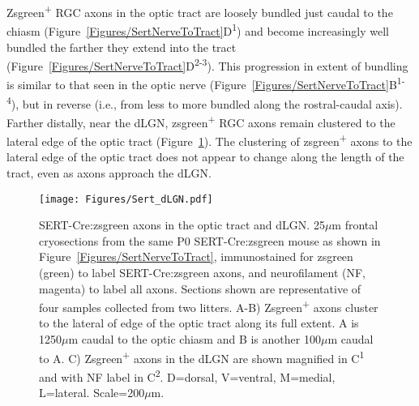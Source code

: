 Zsgreen\textsuperscript{+} RGC axons in the optic tract are loosely bundled just caudal to the chiasm (Figure~\ref{Figures/SertNerveToTract}D\textsuperscript{1}) and become increasingly well bundled the farther they extend into the tract (Figure~\ref{Figures/SertNerveToTract}D\textsuperscript{2-3}).
This progression in extent of bundling is similar to that seen in the optic nerve (Figure~\ref{Figures/SertNerveToTract}B\textsuperscript{1-4}), but in reverse (i.e., from less to more bundled along the rostral-caudal axis).
Farther distally, near the dLGN, zsgreen\textsuperscript{+} RGC axons remain clustered to the lateral edge of the optic tract (Figure~\ref{Figures/SertdLGN}).
The clustering of zsgreen\textsuperscript{+} axons to the lateral edge of the optic tract does not appear to change along the length of the tract, even as axons approach the dLGN.

\begin{figure}[hbtp]
    \begin{center}
        \texttt{[image: Figures/Sert\_dLGN.pdf]}
        \caption[SERT-Cre:zsgreen axons in the optic tract and dLGN.]
        {SERT-Cre:zsgreen axons in the optic tract and dLGN.
        25$\mu$m frontal cryosections from the same P0 SERT-Cre:zsgreen mouse as shown in Figure~\ref{Figures/SertNerveToTract}, immunostained for zsgreen (green) to label SERT-Cre:zsgreen axons, and neurofilament (NF, magenta) to label all axons.
        Sections shown are representative of four samples collected from two litters. %
        A-B) Zsgreen\textsuperscript{+} axons cluster to the lateral of edge of the optic tract along its full extent.
        A is 1250$\mu$m caudal to the optic chiasm and B is another 100$\mu$m caudal to A.
        C) Zsgreen\textsuperscript{+} axons in the dLGN are shown magnified in C\textsuperscript{1} and with NF label in C\textsuperscript{2}.
        D=dorsal, V=ventral, M=medial, L=lateral.
		Scale=200$\mu$m.}
        \label{Figures/SertdLGN}
    \end{center}
\end{figure}